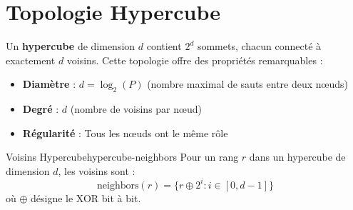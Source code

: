 \documentclass[12pt,a4paper,twoside]{report}
\begin{document}
\section{Topologie Hypercube}

Un \textbf{hypercube} de dimension $d$ contient $2^d$ sommets, chacun connecté à exactement $d$ voisins. Cette topologie offre des propriétés remarquables :

\begin{itemize}
    \item \textbf{Diamètre} : $d = \log_2(P)$ (nombre maximal de sauts entre deux nœuds)
    \item \textbf{Degré} : $d$ (nombre de voisins par nœud)
    \item \textbf{Régularité} : Tous les nœuds ont le même rôle
\end{itemize}

\begin{definition}{Voisins Hypercube}{hypercube-neighbors}
Pour un rang $r$ dans un hypercube de dimension $d$, les voisins sont :
\[
\text{neighbors}(r) = \{r \oplus 2^i : i \in [0, d-1]\}
\]
où $\oplus$ désigne le XOR bit à bit.
\end{definition}
\end{document}
